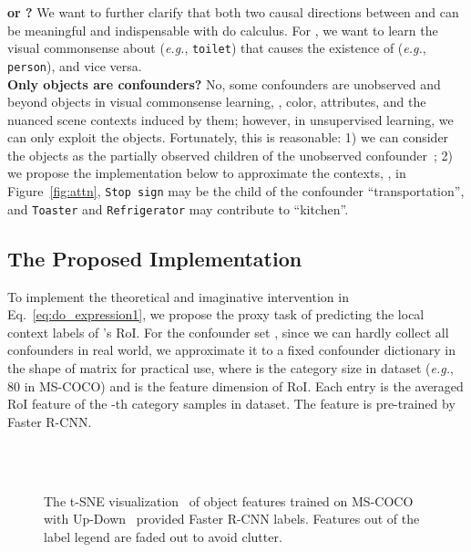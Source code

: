 \documentclass[10pt,twocolumn,letterpaper]{article}
\newcommand\egs{\textit{e.g.}}
\begin{document}
\noindent\textbf{   or   ?}
We want to further clarify that both two causal directions between  and  can be meaningful and indispensable with do calculus. For   , we want to learn the visual commonsense about  (\egs, \texttt{toilet}) that causes the existence of  (\egs, \texttt{person}), and vice versa.\\
\noindent\textbf{Only objects are confounders?} No, some confounders are unobserved and beyond objects in visual commonsense learning, \eg, color, attributes, and the nuanced scene contexts induced by them; however, in unsupervised learning, we can only exploit the objects. Fortunately, this is reasonable: 1) we can consider the objects as the partially observed children of the unobserved confounder~\cite{d2019multi}; 2) we propose the implementation below to approximate the contexts, \eg, in Figure~\ref{fig:attn}, \texttt{Stop sign} may be the child of the confounder ``transportation'', and \texttt{Toaster} and \texttt{Refrigerator} may contribute to ``kitchen''.


\subsection{The Proposed Implementation}
\label{sec:approximation}
To implement the theoretical and imaginative intervention in Eq.~\eqref{eq:do_expression1}, we propose the proxy task of predicting the local context labels of 's RoI. For the confounder set , since we can hardly collect all confounders in real world, we approximate it to a fixed confounder dictionary  in the shape of  matrix for practical use, where  is the category size in dataset (\egs, 80 in MS-COCO) and  is the feature dimension of RoI. Each entry  is the averaged RoI feature of the -th category samples in dataset. The feature is pre-trained by Faster R-CNN.


\begin{figure}[t]
  \centering
     \\ \vspace{-0.1in}
     \\
  \caption{The t-SNE visualization~\cite{maaten2008visualizing} of object features trained on MS-COCO with Up-Down~\cite{anderson2018bottom} provided Faster R-CNN labels. Features out of the label legend are faded out to avoid clutter.}
    \label{fig:tsne}
    \vspace{-0.1in}
\end{figure}
\end{document}
